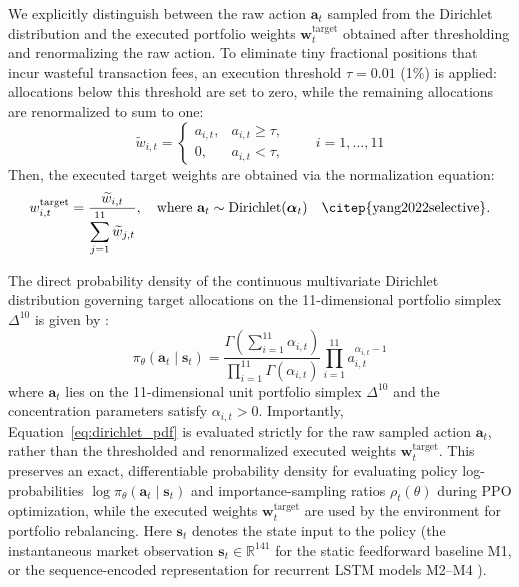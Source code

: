 We explicitly distinguish between the raw action $\mathbf{a}_t$ sampled from the Dirichlet distribution and the executed portfolio weights $\mathbf{w}_t^{\text{target}}$ obtained after thresholding and renormalizing the raw action. To eliminate tiny fractional positions that incur wasteful transaction fees, an execution threshold $\tau = 0.01$ (1\%) is applied: allocations below this threshold are set to zero, while the remaining allocations are renormalized to sum to one:
\begin{equation}
\widetilde{w}_{i,t} =
\begin{cases}
a_{i,t}, & a_{i,t} \ge \tau, \\
0, & a_{i,t} < \tau,
\end{cases}
\qquad i = 1, \dots, 11
\end{equation}
Then, the executed target weights are obtained via the normalization equation:
\begin{equation}
w_{i,t}^{\text{target}} = \frac{\widetilde{w}_{i,t}}{\displaystyle\sum_{j=1}^{11} \widetilde{w}_{j,t}}, \quad \text{where } \mathbf{a}_t \sim \operatorname{Dirichlet}(\boldsymbol{\alpha}_t) \quad \text{\citep{yang2022selective}}.
\end{equation}

The direct probability density of the continuous multivariate Dirichlet distribution governing target allocations on the 11-dimensional portfolio simplex $\Delta^{10}$ is given by \citep{yang2022selective}:
\begin{equation}
\boxed{
\pi_\theta(\mathbf{a}_t \mid \mathbf{s}_t) = \frac{\Gamma\left(\sum_{i=1}^{11}\alpha_{i,t}\right)}{\prod_{i=1}^{11}\Gamma(\alpha_{i,t})} \prod_{i=1}^{11} a_{i,t}^{\alpha_{i,t}-1}
}
\label{eq:dirichlet_pdf}
\end{equation}
where $\mathbf{a}_t$ lies on the 11-dimensional unit portfolio simplex $\Delta^{10}$ and the concentration parameters satisfy $\alpha_{i,t} > 0$. Importantly, Equation~\eqref{eq:dirichlet_pdf} is evaluated strictly for the raw sampled action $\mathbf{a}_t$, rather than the thresholded and renormalized executed weights $\mathbf{w}_t^{\text{target}}$. This preserves an exact, differentiable probability density for evaluating policy log-probabilities $\log \pi_\theta(\mathbf{a}_t \mid \mathbf{s}_t)$ and importance-sampling ratios $\rho_t(\theta)$ during PPO optimization, while the executed weights $\mathbf{w}_t^{\text{target}}$ are used by the environment for portfolio rebalancing. Here $\mathbf{s}_t$ denotes the state input to the policy (the instantaneous market observation $\mathbf{s}_t \in \mathbb{R}^{141}$ for the static feedforward baseline M1, or the sequence-encoded representation for recurrent LSTM models M2--M4 \citep{zou2024novel}).

